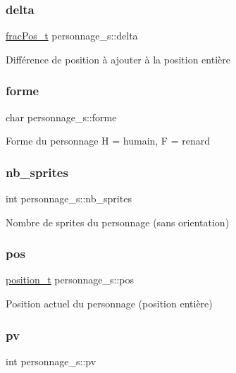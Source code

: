 \subsubsection{\texorpdfstring{delta}{delta}}
{\footnotesize\ttfamily \hyperlink{structfrac_pos__s}{frac\+Pos\+\_\+t} personnage\+\_\+s\+::delta}

Différence de position à ajouter à la position entière \mbox{\label{structpersonnage__s_a1f1eb200420640259201a84300bccf7e}} 
\subsubsection{\texorpdfstring{forme}{forme}}
{\footnotesize\ttfamily char personnage\+\_\+s\+::forme}

Forme du personnage H = humain, F = renard \mbox{\label{structpersonnage__s_aabe3731a1f5bbb6b08c4f9e9d89db0a1}} 
\subsubsection{\texorpdfstring{nb\+\_\+sprites}{nb\_sprites}}
{\footnotesize\ttfamily int personnage\+\_\+s\+::nb\+\_\+sprites}

Nombre de sprites du personnage (sans orientation) \mbox{\label{structpersonnage__s_adea4789f8b55587ec092f3a32b7b1964}} 
\subsubsection{\texorpdfstring{pos}{pos}}
{\footnotesize\ttfamily \hyperlink{structposition__s}{position\+\_\+t} personnage\+\_\+s\+::pos}

Position actuel du personnage (position entière) \mbox{\label{structpersonnage__s_ab3090d9110756af454516f939e9f8a86}} 
\subsubsection{\texorpdfstring{pv}{pv}}
{\footnotesize\ttfamily int personnage\+\_\+s\+::pv}

